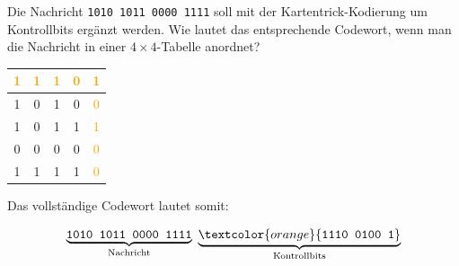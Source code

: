 \begin{myexercise}
	Die Nachricht \texttt{1010 1011 0000 1111} soll mit der
	Kartentrick-Kodierung um Kontrollbits ergänzt werden.
	Wie lautet das entsprechende Codewort, wenn man die Nachricht in einer \(4\times 4\)-Tabelle anordnet?
	\begin{myanswer}

		\begin{center}
			\begin{tabular}{|c|c|c|c|c|}
				\hline
				\textcolor{orange}{1} & \textcolor{orange}{1} &
				\textcolor{orange}{1} & \textcolor{orange}{0} &
				\textcolor{orange}{1}                                                         \\ \hline
				1                     & 0                     & 1 & 0 & \textcolor{orange}{0} \\ \hline
				1                     & 0                     & 1 & 1 & \textcolor{orange}{1} \\ \hline
				0                     & 0                     & 0 & 0 & \textcolor{orange}{0} \\ \hline
				1                     & 1                     & 1 & 1 & \textcolor{orange}{0} \\ \hline
			\end{tabular}
		\end{center}

		Das vollständige Codewort lautet somit:

		\[
			\underbrace{\texttt{1010 1011 0000 1111}}_{\text{Nachricht}}
			\ \underbrace{\textcolor{orange}{\texttt{1110 0100 1}}}_{\text{Kontrollbits}}
		\]
	\end{myanswer}
\end{myexercise}

